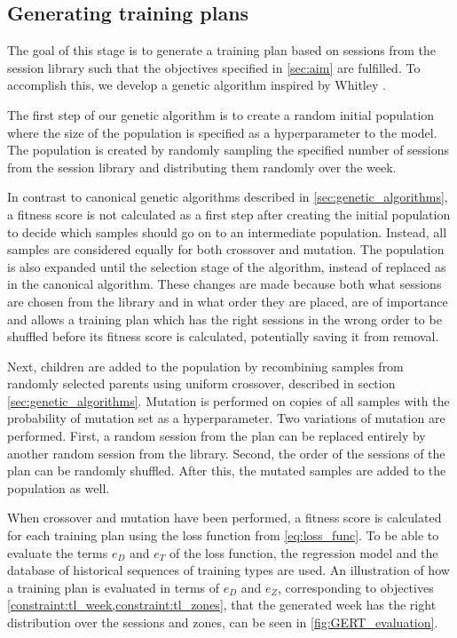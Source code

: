 \subsection{Generating training plans}
The goal of this stage is to generate a training plan based on sessions from the session library such that the objectives specified in \cref{sec:aim} are fulfilled.
To accomplish this, we develop a genetic algorithm inspired by Whitley \cite{whitley1994genetic}.

The first step of our genetic algorithm is to create a random initial population where the size of the population is specified as a hyperparameter to the model.
The population is created by randomly sampling the specified number of sessions from the session library and distributing them randomly over the week.

In contrast to canonical genetic algorithms described in \cref{sec:genetic_algorithms}, a fitness score is not calculated as a first step after creating the initial population to decide which samples should go on to an intermediate population.
Instead, all samples are considered equally for both crossover and mutation.
The population is also expanded until the selection stage of the algorithm, instead of replaced as in the canonical algorithm.
These changes are made because both what sessions are chosen from the library and in what order they are placed, are of importance and allows a training plan which has the right sessions in the wrong order to be shuffled before its fitness score is calculated, potentially saving it from removal.

Next, children are added to the population by recombining samples from randomly selected parents using uniform crossover, described in section \cref{sec:genetic_algorithms}.
Mutation is performed on copies of all samples with the probability of mutation set as a hyperparameter.
Two variations of mutation are performed.
First, a random session from the plan can be replaced entirely by another random session from the library.
Second, the order of the sessions of the plan can be randomly shuffled.
After this, the mutated samples are added to the population as well.

When crossover and mutation have been performed, a fitness score is calculated for each training plan using the loss function from \cref{eq:loss_func}.
To be able to evaluate the terms $e_D$ and $e_T$ of the loss function, the regression model and the database of historical sequences of training types are used. 
An illustration of how a training plan is evaluated in terms of $e_D$ and $e_Z$, corresponding to objectives \cref{constraint:tl_week,constraint:tl_zones}, that the generated week has the right distribution over the sessions and zones, can be seen in \cref{fig:GERT_evaluation}.

